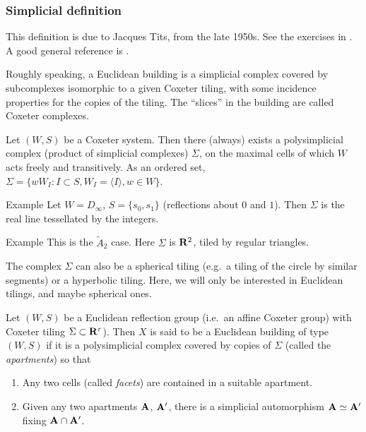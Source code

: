 \subsubsection{Simplicial definition}

This definition is due to Jacques Tits, from the late 1950s. See the exercises 
in \cite[IV]{b02}. A good general reference is \cite{ab08}. 

Roughly speaking, a Euclidean building is a simplicial complex covered by 
subcomplexes isomorphic to a given Coxeter tiling, with some incidence 
properties for the copies of the tiling. The ``slices'' in the building are 
called Coxeter complexes. 

Let $(W,S)$ be a Coxeter system. Then there (always) exists a polysimplicial 
complex (product of simplicial complexes) $\Sigma$, on the maximal 
cells of which $W$ acts freely and transitively. As an ordered set, 
$\Sigma=\{w W_I:I\subset S,W_I=\langle I\rangle, w\in W\}$. 

\begin{enonce}{Example}
Let $W=D_\infty$, $S=\{s_0,s_1\}$ (reflections about $0$ and $1$). Then 
$\Sigma$ is the real line tessellated by the integers. 
\end{enonce}

\begin{enonce}{Example}
This is the $\widetilde A_2$ case. Here $\Sigma$ is $\mathbf{R}^2$, tiled by regular 
triangles. 
\end{enonce}

The complex $\Sigma$ can also be a spherical tiling (e.g.\ a tiling of the 
circle by similar segments) or a hyperbolic tiling. Here, we will only be 
interested in Euclidean tilings, and maybe spherical ones. 

\begin{defi}
Let $(W,S)$ be a Euclidean reflection group (i.e.\ an affine Coxeter group) with 
Coxeter tiling $\Sigma\subset \mathbf{R}^r$). Then $X$ is said to be a Euclidean 
building of type $(W,S)$ if it is a polysimplicial complex covered by copies of 
$\Sigma$ (called the \emph{apartments}) so that 
\begin{enumerate}
  \item Any two cells (called \emph{facets}) are contained in a suitable apartment. 
  \item Given any two apartments $\mathbf{A}$, $\mathbf{A}'$, there is a simplicial 
    automorphism $\mathbf{A}\simeq \mathbf{A}'$ fixing $\mathbf{A}\cap \mathbf{A}'$. 
\end{enumerate}
\end{defi}

